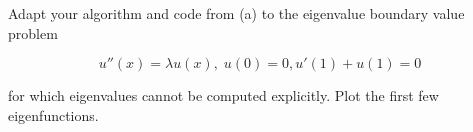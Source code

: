 Adapt your algorithm and code from (a) to the eigenvalue boundary value problem

$$
u''(x) = \lambda u(x), \; u(0) = 0, u'(1) + u(1) = 0
$$

for which eigenvalues cannot be computed explicitly. Plot the first few eigenfunctions.

\begin{solution}\ \\\\
    \ \\
\end{solution}